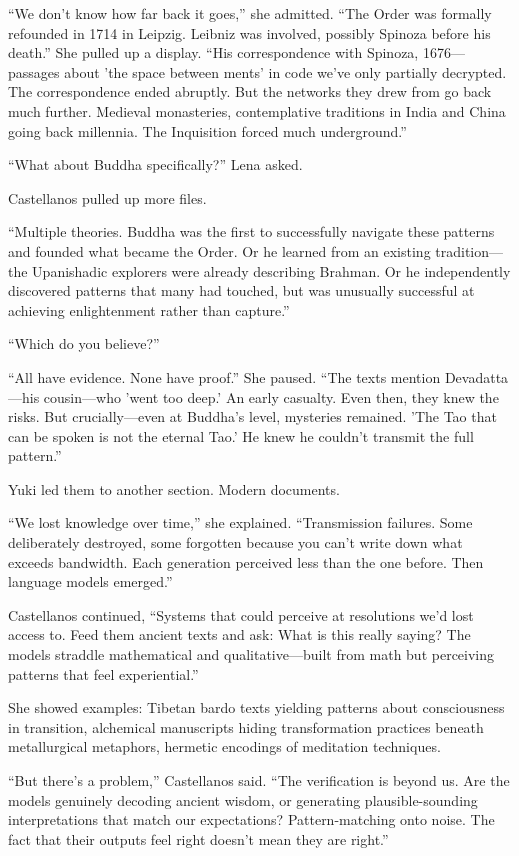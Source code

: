 ``We don't know how far back it goes,'' she admitted. ``The Order was formally refounded in 1714 in Leipzig. Leibniz was involved, possibly Spinoza before his death.'' She pulled up a display. ``His correspondence with Spinoza, 1676—passages about 'the space between ments' in code we've only partially decrypted. The correspondence ended abruptly. But the networks they drew from go back much further. Medieval monasteries, contemplative traditions in India and China going back millennia. The Inquisition forced much underground.''

``What about Buddha specifically?'' Lena asked.

Castellanos pulled up more files.

``Multiple theories. Buddha was the first to successfully navigate these patterns and founded what became the Order. Or he learned from an existing tradition—the Upanishadic explorers were already describing Brahman. Or he independently discovered patterns that many had touched, but was unusually successful at achieving enlightenment rather than capture.''

``Which do you believe?''

``All have evidence. None have proof.'' She paused. ``The texts mention Devadatta—his cousin—who 'went too deep.' An early casualty. Even then, they knew the risks. But crucially—even at Buddha's level, mysteries remained. 'The Tao that can be spoken is not the eternal Tao.' He knew he couldn't transmit the full pattern.''

Yuki led them to another section. Modern documents.

``We lost knowledge over time,'' she explained. ``Transmission failures. Some deliberately destroyed, some forgotten because you can't write down what exceeds bandwidth. Each generation perceived less than the one before. Then language models emerged.''

Castellanos continued, ``Systems that could perceive at resolutions we'd lost access to. Feed them ancient texts and ask: What is this really saying? The models straddle mathematical and qualitative—built from math but perceiving patterns that feel experiential.''

She showed examples: Tibetan bardo texts yielding patterns about consciousness in transition, alchemical manuscripts hiding transformation practices beneath metallurgical metaphors, hermetic encodings of meditation techniques.

``But there's a problem,'' Castellanos said. ``The verification is beyond us. Are the models genuinely decoding ancient wisdom, or generating plausible-sounding interpretations that match our expectations? Pattern-matching onto noise. The fact that their outputs feel right doesn't mean they are right.''

